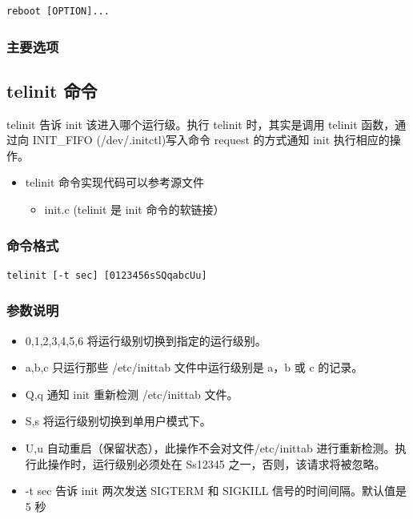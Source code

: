 {\begin{shaded}\begin{verbatim}
reboot [OPTION]...
\end{verbatim}\end{shaded}}
\subsubsection{主要选项}

\subsection{telinit 命令}

telinit 告诉 init 该进入哪个运行级。执行 telinit 时，其实是调用 telinit
函数，通过向 INIT\_FIFO (/dev/.initctl)写入命令 request 的方式通知 init
执行相应的操作。

\begin{itemize}
\item
  telinit 命令实现代码可以参考源文件
  \begin{itemize}
  \item
    init.c (telinit 是 init 命令的软链接）
  \end{itemize}
\end{itemize}
\subsubsection{命令格式}

{\begin{shaded}\begin{verbatim}
telinit [-t sec] [0123456sSQqabcUu]
\end{verbatim}\end{shaded}}
\subsubsection{参数说明}

\begin{itemize}
\item
  0,1,2,3,4,5,6 将运行级别切换到指定的运行级别。
\item
  a,b,c 只运行那些 /etc/inittab 文件中运行级别是 a，b 或 c 的记录。
\item
  Q,q 通知 init 重新检测 /etc/inittab 文件。
\item
  S,s 将运行级别切换到单用户模式下。
\item
  U,u 自动重启（保留状态），此操作不会对文件/etc/inittab
  进行重新检测。执行此操作时，运行级别必须处在 Ss12345
  之一，否则，该请求将被忽略。
\item
  -t sec 告诉 init 两次发送 SIGTERM 和 SIGKILL 信号的时间间隔。默认值是
  5 秒
\end{itemize}
